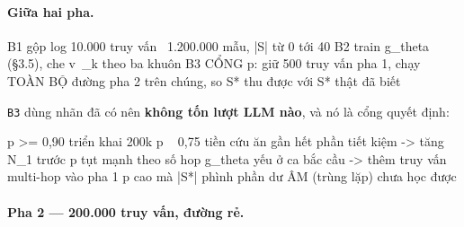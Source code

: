 \documentclass[11pt,a4paper]{article}
\begin{document}

\paragraph{Giữa hai pha.}

\begin{dia}
B1  gộp log 10.000 truy vấn       ~1.200.000 mẫu, |S| từ 0 tới 40
B2  train g_theta (§3.5), che v~_k theo ba khuôn
B3  CỔNG p: giữ 500 truy vấn pha 1, chạy TOÀN BỘ đường pha 2 trên chúng,
      so S* thu được với S* thật đã biết
\end{dia}

\texttt{B3} dùng nhãn đã có nên \textbf{không tốn lượt LLM nào}, và nó là cổng quyết định:

\begin{dia}
p >= 0,90                triển khai 200k
p ~  0,75                tiền cứu ăn gần hết phần tiết kiệm -> tăng N_1 trước
p tụt mạnh theo số hop   g_theta yếu ở ca bắc cầu -> thêm truy vấn multi-hop vào pha 1
p cao mà |S*| phình      phần dư ÂM (trùng lặp) chưa học được
\end{dia}

\paragraph{Pha 2 --- 200.000 truy vấn, đường rẻ.}
\end{document}
